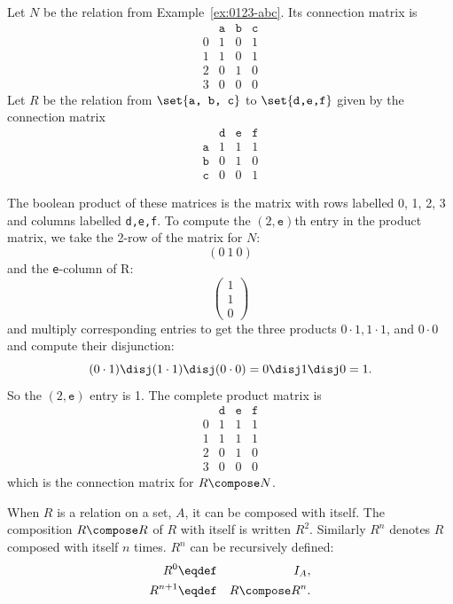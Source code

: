 \begin{example}
Let $N$ be the relation from Example~\ref{ex:0123-abc}.  Its connection
matrix is
\[\begin{array}{r|ccc}
& \texttt{a}&  \texttt{b}&  \texttt{c}\\
\hline  
0& 1&  0&  1\\
1& 1&  0&  1\\
2& 0&  1&  0\\
3& 0&  0&  0
\end{array}
\]
Let $R$ be the relation from $\set{\texttt{a, b, c}}$ to
$\set{\texttt{d,e,f}}$ given by the connection matrix
\[\begin{array}{r|ccc}
& \texttt{d}&  \texttt{e}&  \texttt{f}\\
\hline  
\texttt{a}& 1&  1&  1\\
\texttt{b}& 0&  1&  0\\
\texttt{c}& 0&  0&  1
\end{array}
\]

The boolean product of these matrices is the matrix with rows labelled 0,
1, 2, 3 and columns labelled \texttt{d,e,f}.  To compute the
$(2,\texttt{e})$th entry in the product matrix, we take the 2-row of the
matrix for $N$:
\[
(0\ 1\  0)
\]
and the \texttt{e}-column of R:
\[
\left(\begin{array}{c}
1\\
1\\
0
\end{array}\right)
\]
and multiply corresponding entries to get the three products $0\cdot1, 1
\cdot 1$, and $0 \cdot 0$ and compute their disjunction:
\[
(0\cdot1) \disj (1 \cdot 1) \disj (0 \cdot 0) = 0 \disj 1 \disj 0 = 1.
\]
So the $(2,\texttt{e})$ entry is 1.  The complete product matrix is
\[\begin{array}{r|ccc}
& \texttt{d} &  \texttt{e} &  \texttt{f} \\
\hline  
0& 1&  1&  1\\
1& 1&  1&  1\\
2& 0&  1&  0\\
3& 0&  0&  0
\end{array}
\]
which is the connection matrix for $R \compose N$.
\end{example}

When $R$ is a relation on a set, $A$, it can be composed with itself.  The
composition $R \compose R$ of $R$ with itself is written $R^2$.  Similarly
$R^n$ denotes $R$ composed with itself $n$ times.  $R^n$ can be
recursively defined:
\begin{eqnarray*}
R^0 & \eqdef & I_A,\\
R^{n+1} & \eqdef & R \compose R^{n}.
\end{eqnarray*}

